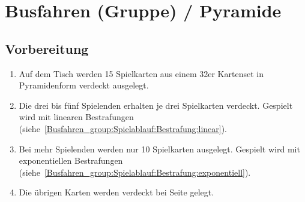 \chapter{Busfahren (Gruppe) / Pyramide}
\section{Vorbereitung}
\begin{enumerate}[label={(\arabic*)}]
    \item Auf dem Tisch werden 15 Spielkarten aus einem 32er Kartenset in Pyramidenform verdeckt ausgelegt.
    \item Die drei bis fünf Spielenden erhalten je drei Spielkarten verdeckt. Gespielt wird mit linearen Bestrafungen (siehe~\ref{Busfahren_group:Spielablauf:Bestrafung:linear}).
    \item Bei mehr Spielenden werden nur 10 Spielkarten ausgelegt. Gespielt wird mit exponentiellen Bestrafungen (siehe~\ref{Busfahren_group:Spielablauf:Bestrafung:exponentiell}).
    \item Die übrigen Karten werden verdeckt bei Seite gelegt.
\end{enumerate}

